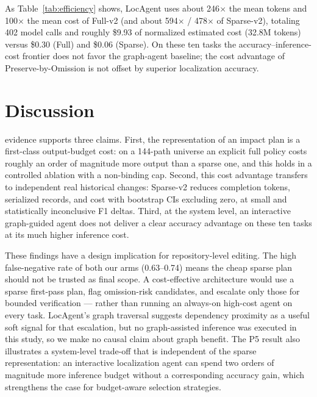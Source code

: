 As Table~\ref{tab:efficiency} shows, LocAgent uses about 246$\times$ the mean
tokens and 100$\times$ the mean cost of Full-v2 (and about 594$\times$ /
478$\times$ of Sparse-v2), totaling 402 model calls and roughly \$9.93 of
normalized estimated cost (32.8M tokens) versus \$0.30 (Full) and \$0.06
(Sparse). On these ten tasks the accuracy--inference-cost frontier does not
favor the graph-agent baseline; the cost advantage of Preserve-by-Omission is
not offset by superior localization accuracy.

\section{Discussion}
 evidence supports three claims. First, the representation
of an impact plan is a first-class output-budget cost: on a 144-path universe
an explicit full policy costs roughly an order of magnitude more output than a
sparse one, and this holds in a controlled ablation with a non-binding cap.
Second, this cost advantage transfers to independent real historical changes:
Sparse-v2 reduces completion tokens, serialized records, and cost with
bootstrap CIs excluding zero, at small and statistically inconclusive F1
deltas. Third, at the system level, an interactive graph-guided agent does not
deliver a clear accuracy advantage on these ten tasks at its much higher
inference cost.

These findings have a design implication for repository-level editing. The
high false-negative rate of both our arms (0.63--0.74) means the cheap sparse
plan should not be trusted as final scope. A cost-effective architecture would
use a sparse first-pass plan, flag omission-risk candidates, and escalate only
those for bounded verification --- rather than running an always-on
high-cost agent on every task. LocAgent's graph traversal suggests dependency
proximity as a useful soft signal for that escalation, but no graph-assisted
inference was executed in this study, so we make no causal claim about graph
benefit. The P5 result also illustrates a system-level trade-off that is
independent of the sparse representation: an interactive localization agent can
spend two orders of magnitude more inference budget without a corresponding
accuracy gain, which strengthens the case for budget-aware selection
strategies.

